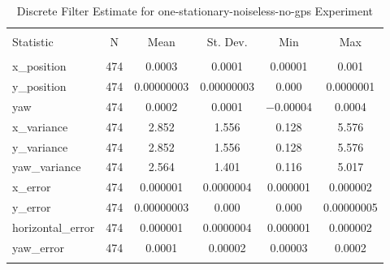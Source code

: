 
\begin{table}[h] \centering 
  \caption{Discrete Filter Estimate for one-stationary-noiseless-no-gps Experiment} 
  \label{tab:one_stationary_noiseless_no_gps_discrete_summary} 
\begin{tabular}{@{\extracolsep{5pt}}lccccc} 
\\[-1.8ex]\hline 
\hline \\[-1.8ex] 
Statistic & \multicolumn{1}{c}{N} & \multicolumn{1}{c}{Mean} & \multicolumn{1}{c}{St. Dev.} & \multicolumn{1}{c}{Min} & \multicolumn{1}{c}{Max} \\ 
\hline \\[-1.8ex] 
x\_position & 474 & \num{0.0003} & \num{0.0001} & \num{0.00001} & \num{0.001} \\ 
y\_position & 474 & \num{0.00000003} & \num{0.00000003} & \num{0.000} & \num{0.0000001} \\ 
yaw & 474 & \num{0.0002} & \num{0.0001} & $-$0.00004 & \num{0.0004} \\ 
x\_variance & 474 & \num{2.852} & \num{1.556} & \num{0.128} & \num{5.576} \\ 
y\_variance & 474 & \num{2.852} & \num{1.556} & \num{0.128} & \num{5.576} \\ 
yaw\_variance & 474 & \num{2.564} & \num{1.401} & \num{0.116} & \num{5.017} \\ 
x\_error & 474 & \num{0.000001} & \num{0.0000004} & \num{0.000001} & \num{0.000002} \\ 
y\_error & 474 & \num{0.00000003} & \num{0.000} & \num{0.000} & \num{0.00000005} \\ 
horizontal\_error & 474 & \num{0.000001} & \num{0.0000004} & \num{0.000001} & \num{0.000002} \\ 
yaw\_error & 474 & \num{0.0001} & \num{0.00002} & \num{0.00003} & \num{0.0002} \\ 
\hline \\[-1.8ex] 
\end{tabular} 
\end{table} 

